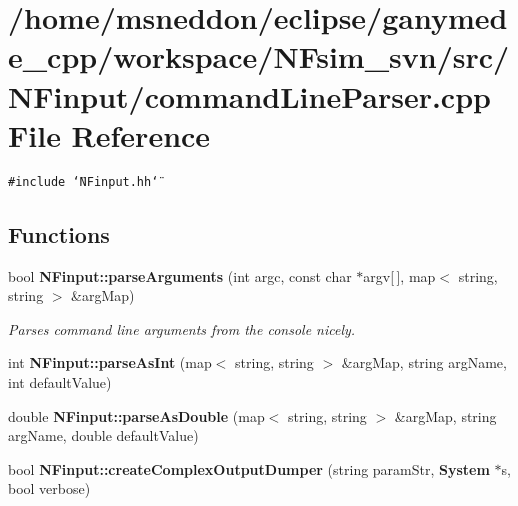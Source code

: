 \section{/home/msneddon/eclipse/ganymede\_\-cpp/workspace/NFsim\_\-svn/src/NFinput/commandLineParser.cpp File Reference}
\label{commandLineParser_8cpp}


{\tt \#include \char`\"{}NFinput.hh\char`\"{}}\par
\subsection*{Functions}
\begin{CompactItemize}
\item 
bool {\bf NFinput::parseArguments} (int argc, const char $\ast$argv[$\,$], map$<$ string, string $>$ \&argMap)
\begin{CompactList}\small\item\em Parses command line arguments from the console nicely. \item\end{CompactList}\item 
int {\bf NFinput::parseAsInt} (map$<$ string, string $>$ \&argMap, string argName, int defaultValue)
\item 
double {\bf NFinput::parseAsDouble} (map$<$ string, string $>$ \&argMap, string argName, double defaultValue)
\item 
bool {\bf NFinput::createComplexOutputDumper} (string paramStr, {\bf System} $\ast$s, bool verbose)
\end{CompactItemize}
